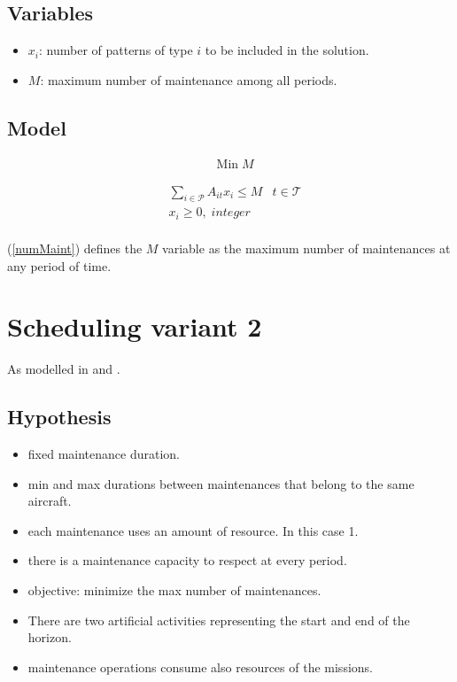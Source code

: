 \documentclass[a4paper,11pt]{article}
\begin{document}
    \subsection{Variables}

    \begin{itemize}
        \item $x_i$: number of patterns of type $i$ to be included in the solution.
        \item $M$: maximum number of maintenance among all periods.
    \end{itemize}

    \subsection{Model}

    \begin{align}
        & \text{Min}\; M
    \end{align}

    \begin{align}
        & \sum_{i \in \mathcal{P}} A_{it}x_{i} \leq M & t \in \mathcal{T} \label{numMaint} \\
        & x_{i} \geq 0,\; integer \\
    \end{align}

        (\ref{numMaint}) defines the $M$ variable as the maximum number of maintenances at any period of time.


\clearpage

\section{Scheduling variant 2}

    As modelled in \cite{Rieck2012} and \cite{Neumann2000}.

    \subsection{Hypothesis}

    \begin{itemize}
     \item fixed maintenance duration.
     \item min and max durations between maintenances that belong to the same aircraft.
     \item each maintenance uses an amount of resource. In this case 1.
     \item there is a maintenance capacity to respect at every period.
     \item objective: minimize the max number of maintenances.
     \item There are two artificial activities representing the start and end of the horizon.
     \item maintenance operations consume also resources of the missions.
    \end{itemize}
\end{document}
